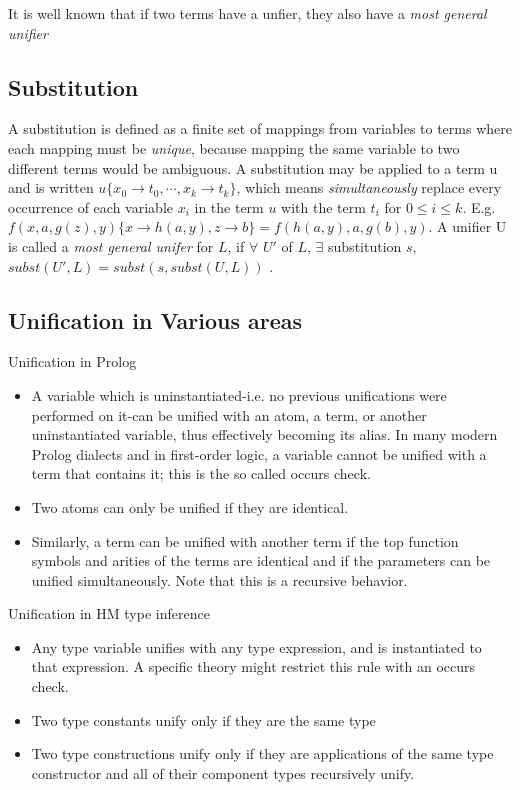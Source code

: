 It is well known that if two terms have a unfier, they also have a
\textit{most general unifier}
\subsection{Substitution}

A substitution is defined as a finite set of mappings from variables
to terms where each mapping must be \textit{unique}, because mapping
the same variable to two different terms would be ambiguous. A
substitution may be applied to a term u and is written $u\{ x_0
\rightarrow t_0, \cdots, x_k \rightarrow t_k \}$, which means
\textit{simultaneously} replace every occurrence of each variable
$x_i$ in the term $u$ with the term $t_i$ for $0 \le i \le k $. E.g.
$f(x,a,g(z),y)\{x \rightarrow h(a,y), z \rightarrow b \} = f(h(a,y), a
, g(b),y)$. A unifier U is called a \textit{most general unifer} for
$L$, if $\forall$ $U'$ of $L$, $\exists$ substitution $s$, $subst(U',L) =
subst(s, subst(U,L))$ .

\subsection{Unification in Various areas}

Unification in Prolog
\begin{itemize}
\item A variable which is uninstantiated-i.e. no previous unifications
  were performed on it-can be unified with an atom, a term, or another
  uninstantiated variable, thus effectively becoming its alias. In
  many modern Prolog dialects and in first-order logic, a variable
  cannot be unified with a term that contains it; this is the so
  called occurs check.

\item Two atoms can only be unified if they are identical.


\item Similarly, a term can be unified with another term if the top
  function symbols and arities of the terms are identical and if the
  parameters can be unified simultaneously. Note that this is a
  recursive behavior.

\end{itemize}
Unification in HM type inference 

\begin{itemize}
\item Any type variable unifies with any type expression, and is
  instantiated to that expression. A specific theory might restrict
  this rule with an occurs check.
\item Two type constants unify only if they are the same type
\item Two type constructions unify only if they are applications of
  the same type constructor and all of their component types
  recursively unify.
\end{itemize}

